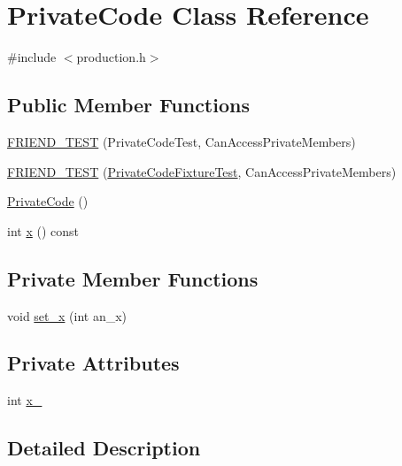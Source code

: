\hypertarget{classPrivateCode}{\section{\-Private\-Code \-Class \-Reference}
\label{dc/d2d/classPrivateCode}
}


{\ttfamily \#include $<$production.\-h$>$}

\subsection*{\-Public \-Member \-Functions}
\begin{DoxyCompactItemize}
\item 
\hyperlink{classPrivateCode_a411adb5a1b979df0ac98a204f63dde4b}{\-F\-R\-I\-E\-N\-D\-\_\-\-T\-E\-S\-T} (\-Private\-Code\-Test, \-Can\-Access\-Private\-Members)
\item 
\hyperlink{classPrivateCode_ab840a7f8dc715de878b55f2e4bfce2b1}{\-F\-R\-I\-E\-N\-D\-\_\-\-T\-E\-S\-T} (\hyperlink{gtest__prod__test_8cc_a89debba10c803e339ce0f9b0b34a2267}{\-Private\-Code\-Fixture\-Test}, \-Can\-Access\-Private\-Members)
\item 
\hyperlink{classPrivateCode_a7eba6e615c78d0e5ac72bbaeed671f01}{\-Private\-Code} ()
\item 
int \hyperlink{classPrivateCode_a971a06eb44d062213dea454cf065b247}{x} () const 
\end{DoxyCompactItemize}
\subsection*{\-Private \-Member \-Functions}
\begin{DoxyCompactItemize}
\item 
void \hyperlink{classPrivateCode_a5dd5ad4485346c3f21194bf0d6334c61}{set\-\_\-x} (int an\-\_\-x)
\end{DoxyCompactItemize}
\subsection*{\-Private \-Attributes}
\begin{DoxyCompactItemize}
\item 
int \hyperlink{classPrivateCode_a4bdeef619f9e0b516191fc07ef9ced5c}{x\-\_\-}
\end{DoxyCompactItemize}


\subsection{\-Detailed \-Description}


